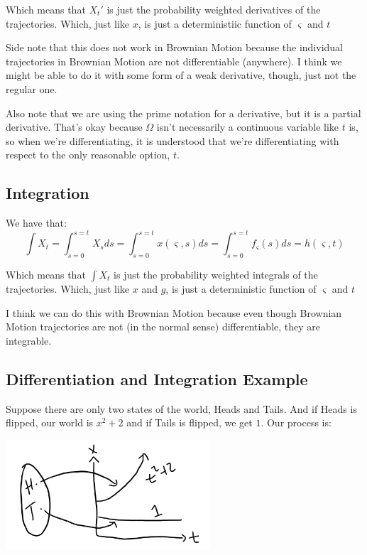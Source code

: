 \documentclass{article}
\begin{document}
Which means that $X_t'$ is just the probability weighted derivatives of the trajectories. Which, just like $x$, is just a deterministiic function of $\varsigma$ and $t$

Side note that this does not work in Brownian Motion because the individual trajectories in Brownian Motion are not differentiable (anywhere).  I think we might be able to do it with some form of a weak derivative, though, just not the regular one.

Also note that we are using the prime notation for a derivative, but it is a partial derivative. That's okay because $\Omega$ isn't necessarily a continuous variable like $t$ is, so when we're differentiating, it is understood that we're differentiating with respect to the only reasonable option, $t$.

\subsection{Integration}
We have that:
$$\int X_t= \int_{s = 0}^{s = t} X_s ds = \int_{s = 0}^{s = t} x\left(\varsigma,s\right) ds = \int_{s = 0}^{s = t} f_\varsigma\left(s\right) ds  = h\left(\varsigma,t\right)$$

Which means that $\int X_t$ is just the probability weighted integrals of the trajectories.  Which, just like $x$ and $g$, is just a deterministic function of $\varsigma$ and $t$

I think we can do this with Brownian Motion because even though Brownian Motion trajectories are not (in the normal sense) differentiable, they are integrable.

\subsection{Differentiation and Integration Example}
Suppose there are only two states of the world, Heads and Tails.  And if Heads is flipped, our world is $x^2 + 2$ and if Tails is flipped, we get $1$.  Our process is:

\includegraphics[width=3in]{ExampleProcess.png}
\centering
\end{document}
